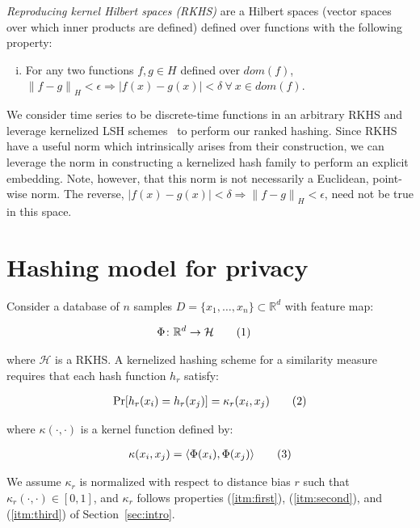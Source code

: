 \documentclass[a4paper]{article}
\newcommand\numberthis{\addtocounter{equation}{1}\tag{\theequation}}
\newcommand{\norm}[1]{\left\lVert#1\right\rVert}
\newcommand{\innerproduct}[2]{\langle{}#1,#2\rangle{}}
\begin{document}
\textit{Reproducing kernel Hilbert spaces (RKHS)} are a Hilbert spaces (vector spaces over which inner products are defined) defined over functions with the following property:
\begin{enumerate}[(i)]
    \item For any two functions $f,g \in H$ defined over $dom(f)$, $\norm{f-g}_{H} < \epsilon \Rightarrow |f(x)-g(x)| < \delta~\forall~x \in dom(f)$. 
\end{enumerate}

We consider time series to be discrete-time functions in an arbitrary RKHS and leverage kernelized LSH schemes~\cite{Kale14-KLSH,Jiang15-KLSH, Kulis12-KLSH} to perform our ranked hashing.
Since RKHS have a useful norm which intrinsically arises from their construction, we can leverage the norm in constructing a kernelized hash family to perform an explicit embedding.
Note, however, that this norm is not necessarily a Euclidean, point-wise norm.
The reverse, $|f(x)-g(x)| < \delta \Rightarrow \norm{f-g}_{H} < \epsilon$, need not be true in this space.


\section{Hashing model for privacy}

Consider a database of $n$ samples $D = \{x_1,\ldots,x_n\} \subset \mathbb{R}^d$ with feature map:

\begin{align*}
    \Phi \colon \mathbb{R}^d &\to \mathcal{H} \numberthis
\end{align*}

where $\mathcal{H}$ is a RKHS\@.
A kernelized hashing scheme for a similarity measure requires that each hash function $h_r$ satisfy:

\begin{align*}
    \Pr[h_r(x_i) = h_r(x_j)] = \kappa_r(x_i, x_j) \numberthis
    \label{eqn:hash_collision}
\end{align*}

where $\kappa(\cdot,\cdot)$ is a kernel function defined by:

\begin{align*}
    \kappa(x_i,x_j) = \innerproduct{\Phi(x_i)}{\Phi(x_j)} \numberthis
\end{align*}

We assume $\kappa_r$ is normalized with respect to distance bias $r$ such that $\kappa_r(\cdot,\cdot) \in [0,1]$, and $\kappa_r$ follows properties (\ref{itm:first}), (\ref{itm:second}), and (\ref{itm:third}) of Section~\ref{sec:intro}.
\end{document}
